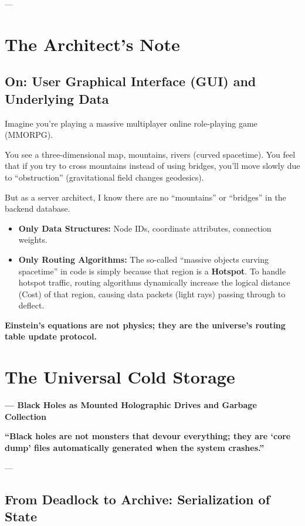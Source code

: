 \documentclass[11pt,a4paper,twoside]{book}
\begin{document}
---

\section{The Architect's Note}

\subsection{On: User Graphical Interface (GUI) and Underlying Data}

Imagine you're playing a massive multiplayer online role-playing game (MMORPG).

You see a three-dimensional map, mountains, rivers (curved spacetime). You feel that if you try to cross mountains instead of using bridges, you'll move slowly due to ``obstruction'' (gravitational field changes geodesics).

But as a server architect, I know there are no ``mountains'' or ``bridges'' in the backend database.

\begin{itemize}
\item \textbf{Only Data Structures:} Node IDs, coordinate attributes, connection weights.

\item \textbf{Only Routing Algorithms:} The so-called ``massive objects curving spacetime'' in code is simply because that region is a \textbf{Hotspot}. To handle hotspot traffic, routing algorithms dynamically increase the logical distance (Cost) of that region, causing data packets (light rays) passing through to deflect.
\end{itemize}

\textbf{Einstein's equations are not physics; they are the universe's routing table update protocol.}

 \section{The Universal Cold Storage}

\textbf{--- Black Holes as Mounted Holographic Drives and Garbage Collection}

\textbf{``Black holes are not monsters that devour everything; they are `core dump' files automatically generated when the system crashes.''}

---

\subsection{From Deadlock to Archive: Serialization of State}
\end{document}
